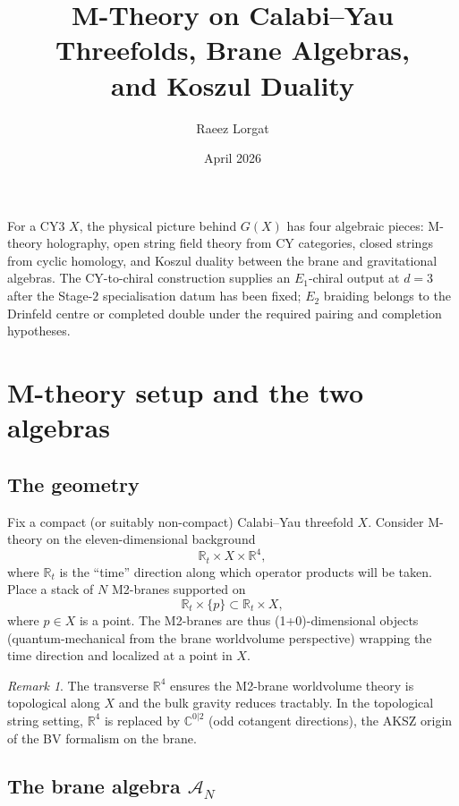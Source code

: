 \documentclass[11pt]{article}
\title{M-Theory on Calabi--Yau Threefolds, Brane Algebras, \\
 and Koszul Duality}
\author{Raeez Lorgat}
\date{April 2026}
\theoremstyle{definition}
\theoremstyle{remark}
\newtheorem{remark}[theorem]{Remark}
\newcommand{\cA}{\mathcal{A}}
\newcommand{\Eone}{E_1}
\newcommand{\Etwo}{E_2}
\begin{document}
\maketitle

\tableofcontents

\bigskip

\noindent
For a CY3 $X$, the physical picture behind $G(X)$ has four algebraic pieces: M-theory holography, open string field theory from CY categories, closed strings from cyclic homology, and Koszul duality between the brane and gravitational algebras. The CY-to-chiral construction supplies an $\Eone$-chiral output at $d=3$ after the Stage-$2$ specialisation datum has been fixed; $\Etwo$ braiding belongs to the Drinfeld centre or completed double under the required pairing and completion hypotheses.


\section{M-theory setup and the two algebras}
\label{sec:mtheory-setup}

\subsection{The geometry}

Fix a compact (or suitably non-compact) Calabi--Yau threefold $X$. Consider
M-theory on the eleven-dimensional background
\[
 \mathbb{R}_t \times X \times \mathbb{R}^4,
\]
where $\mathbb{R}_t$ is the ``time'' direction along which operator products
will be taken. Place a stack of $N$ M2-branes supported on
\[
 \mathbb{R}_t \times \{p\} \subset \mathbb{R}_t \times X,
\]
where $p \in X$ is a point. The M2-branes are thus (1+0)-dimensional objects
(quantum-mechanical from the brane worldvolume perspective) wrapping the time
direction and localized at a point in $X$.

\begin{remark}
The transverse $\mathbb{R}^4$ ensures the M2-brane worldvolume theory is topological along $X$ and the bulk gravity reduces tractably. In the topological string setting, $\mathbb{R}^4$ is replaced by $\mathbb{C}^{0|2}$ (odd cotangent directions), the AKSZ origin of the BV formalism on the brane.
\end{remark}

\subsection{The brane algebra $\cA_N$}
\end{document}
